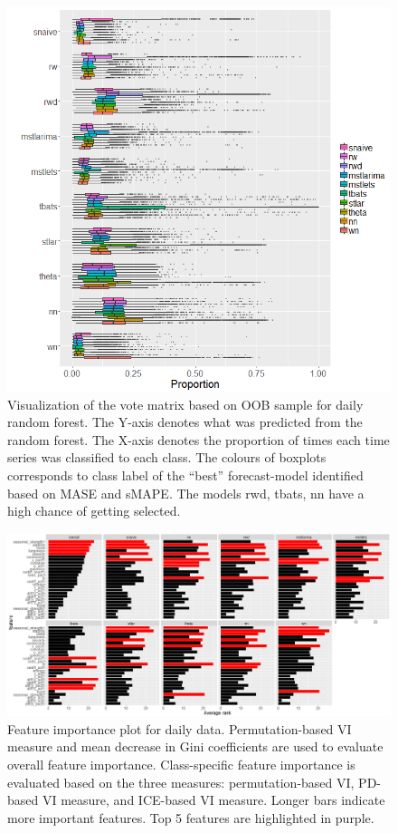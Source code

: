 \documentclass[11pt,a4paper,]{article}
\begin{document}
\begin{figure}
\centering
\includegraphics{figures/oobdaily-1.png}
\caption{\label{fig:oobdaily}Visualization of the vote matrix based on OOB sample for daily random forest. The Y-axis denotes what was predicted from the random forest. The X-axis denotes the proportion of times each time series was classified to each class. The colours of boxplots corresponds to class label of the ``best'' forecast-model identified based on MASE and sMAPE. The models rwd, tbats, nn have a high chance of getting selected.}
\end{figure}

\begin{figure}[h]

{\centering \includegraphics{figures/vidaily-1} 

}

\caption{Feature importance plot for daily data. Permutation-based VI measure and mean decrease in Gini coefficients are used to evaluate overall feature importance. Class-specific feature importance is evaluated based on the three measures: permutation-based VI, PD-based VI measure, and ICE-based VI measure. Longer bars indicate more important features. Top 5 features are highlighted in purple.}\label{fig:vidaily}
\end{figure}
\end{document}
